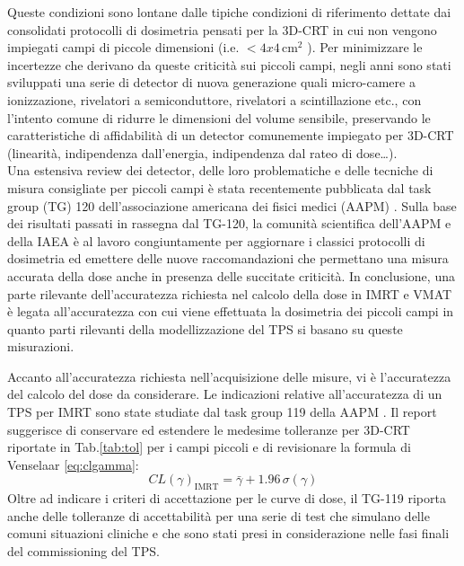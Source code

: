 Queste condizioni sono lontane dalle tipiche condizioni di riferimento dettate dai consolidati protocolli di dosimetria \cite{Almond1999,Andreo2006} pensati per la 3D-CRT in cui non vengono impiegati campi di piccole dimensioni (i.e. $<4x4\,$cm$^2$ \cite{Das2008}). Per minimizzare le incertezze che derivano da queste criticità sui piccoli campi, negli anni sono stati sviluppati una serie di detector di nuova generazione quali micro-camere a ionizzazione, rivelatori a semiconduttore, rivelatori a scintillazione etc., con l'intento comune di ridurre le dimensioni del volume sensibile, preservando le caratteristiche di affidabilità di un detector comunemente impiegato per 3D-CRT (linearità, indipendenza dall'energia, indipendenza dal rateo di dose\ldots).\\
Una estensiva review dei detector, delle loro problematiche e delle tecniche di misura consigliate per piccoli campi è stata recentemente pubblicata dal task group (TG) 120 dell'associazione americana dei fisici medici (AAPM) \cite{Low2011}. Sulla base dei risultati passati in rassegna dal TG-120, la comunità scientifica dell'AAPM e della IAEA è al lavoro congiuntamente per aggiornare i classici protocolli di dosimetria ed emettere delle nuove raccomandazioni che permettano una misura accurata della dose anche in presenza delle succitate criticità. In conclusione, una parte rilevante dell'accuratezza richiesta nel calcolo della dose in IMRT e VMAT è legata all'accuratezza con cui viene effettuata la dosimetria dei piccoli campi in quanto parti rilevanti della modellizzazione del TPS si basano su queste misurazioni.

Accanto all'accuratezza richiesta nell'acquisizione delle misure, vi è l'accuratezza del calcolo del dose da considerare. Le indicazioni relative all'accuratezza di un TPS per IMRT sono state studiate dal task group 119 della AAPM \cite{Ezzell2009}. Il report suggerisce di conservare ed estendere le medesime tolleranze per 3D-CRT riportate in Tab.\ref{tab:tol} per i campi piccoli e di revisionare la formula di Venselaar \eqref{eq:clgamma}:
\begin{equation}
CL(\gamma)_{\text{IMRT}} = \bar{\gamma} + 1.96\,\sigma(\gamma)
\end{equation}
Oltre ad indicare i criteri di accettazione per le curve di dose, il TG-119 riporta anche delle tolleranze di accettabilità per una serie di test che simulano delle comuni situazioni cliniche e che sono stati presi in considerazione nelle fasi finali del commissioning del TPS. 

